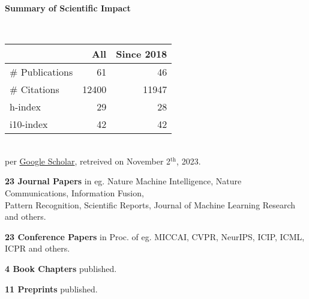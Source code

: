 \headedsection %
{\bf Summary of Scientific Impact}{}{}
{
    \qquad~~~~
    \begin{minipage}[t]{0.6\textwidth}
        \begin{tabular}{lrr}
        \hline
         & All & Since 2018\\
        \hline
        \# Publications & 61     & 46    \\
        \# Citations    & 12400  & 11947 \\
        h-index         & 29     & 28    \\
        i10-index       & 42     & 42    \\
        \hline
    \end{tabular}
    \\
    {\footnotesize{
        per \href{https://scholar.google.com/citations?user=wpLQuroAAAAJ}{Google Scholar},
        retreived on November 2$^\text{th}$, 2023.
        }
    }
    \end{minipage}

    \ifdefined\shortcv
        \vstep
        {\bf 23 Journal Papers} in eg. Nature Machine Intelligence, Nature Communications, Information Fusion,\\
        \hspace*{\fill} Pattern Recognition, Scientific Reports, Journal of Machine Learning Research and others.

        {\bf 23 Conference Papers} in Proc. of eg. MICCAI, CVPR, NeurIPS, ICIP, ICML, ICPR and others.

        {\bf 4 Book Chapters} published.

        {\bf 11 Preprints} published.
        
    \else
        {}
    \fi

}
